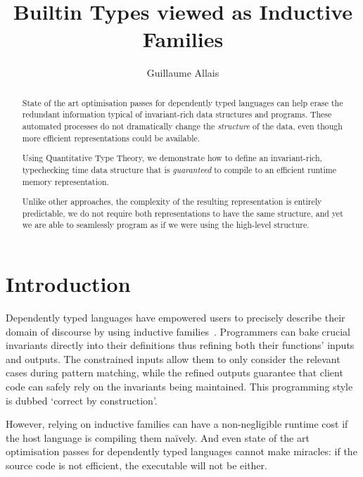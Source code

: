 \documentclass{article}
\newcommand{\idris}{Idris 2}
\begin{document}
\title{Builtin Types viewed as Inductive Families
}
\author{Guillaume Allais}

\maketitle

\begin{abstract}
  State of the art optimisation passes for dependently typed languages can help
  erase the redundant information typical of invariant-rich data structures and
  programs.
  These automated processes do not dramatically change the \emph{structure} of
  the data, even though more efficient representations could be available.

  Using Quantitative Type Theory, we demonstrate how to define an invariant-rich,
  typechecking time data structure that is \emph{guaranteed} to compile to an
  efficient runtime memory representation.

  Unlike other approaches, the complexity of the resulting representation is
  entirely predictable, we do not require both representations to have the
  same structure, and yet we are able to seamlessly program as if we were
  using the high-level structure.
\end{abstract}


\section{Introduction}

Dependently typed languages have empowered users to precisely describe their domain
of discourse by using inductive families~\cite{DBLP:journals/fac/Dybjer94}.
%
Programmers can bake crucial invariants directly into their definitions thus refining
both their functions' inputs and outputs.
%
The constrained inputs allow them to only consider the relevant cases during pattern
matching, while the refined outputs guarantee that client code can safely rely on the
invariants being maintained.
%
This programming style is dubbed `correct by construction'.

However, relying on inductive families can have a non-negligible runtime cost if
the host language is compiling them naïvely. And even state of the art optimisation
passes for dependently typed languages cannot make miracles: if the source code is
not efficient, the executable will not be either.
\end{document}
